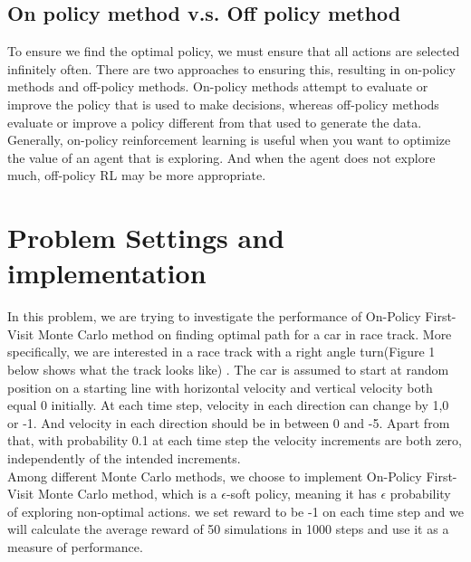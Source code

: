\documentclass[12pt]{article}
\begin{document}
\subsection{On policy method v.s. Off policy method}
To ensure we find the optimal policy, we must ensure that all actions are selected infinitely often. There are two approaches to ensuring this, resulting in on-policy methods and off-policy methods. On-policy methods attempt to evaluate or improve the policy that is used to make decisions, whereas off-policy methods evaluate or improve a policy different from that used to generate the data. Generally, on-policy reinforcement learning is useful when you want to optimize the value of an agent that is exploring. And when the agent does not explore much, off-policy RL may be more appropriate.

\section{Problem Settings and implementation}
In this problem, we are trying to investigate the performance of On-Policy First-Visit Monte Carlo method on finding optimal path for a car in race track. More specifically, we are interested in a race track with a right angle turn(Figure 1 below shows what the track looks like) . The car is assumed to start at random position on a starting line with horizontal velocity and vertical velocity both equal 0 initially. At each time step, velocity in each direction can change by 1,0 or -1. And velocity in each direction should be in between 0 and -5. Apart from that, with probability 0.1 at each time step the velocity increments are both zero, independently of the intended increments. \\

Among different Monte Carlo methods, we choose to implement On-Policy First-Visit Monte Carlo method, which is a $\epsilon $-soft policy, meaning it has $\epsilon$ probability of exploring non-optimal actions. we set reward to be -1 on each time step and we will calculate the average reward of 50 simulations in 1000 steps and use it as a measure of performance.


\pagebreak
\end{document}
